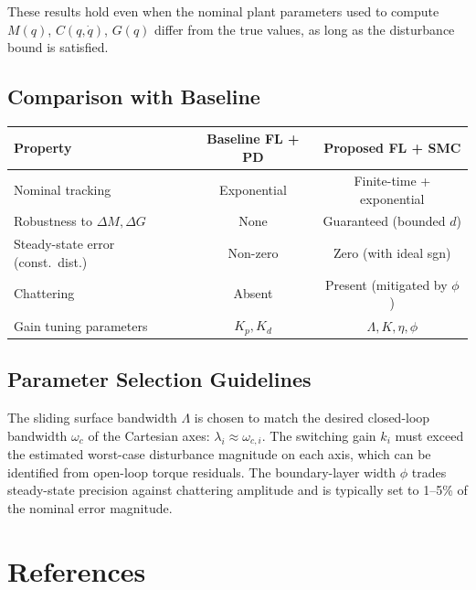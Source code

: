 \documentclass[11pt,a4paper]{article}
\begin{document}
These results hold even when the nominal plant parameters used to compute
$M(q)$, $C(q,\dot{q})$, $G(q)$ differ from the true values, as long as the
disturbance bound is satisfied.

\subsection{Comparison with Baseline}

\begin{center}
\begin{tabular}{@{}lcc@{}}
\toprule
\textbf{Property} & \textbf{Baseline FL + PD} & \textbf{Proposed FL + SMC} \\
\midrule
Nominal tracking               & Exponential          & Finite-time + exponential \\
Robustness to $\Delta M, \Delta G$ & None             & Guaranteed (bounded $d$)  \\
Steady-state error (const.\ dist.) & Non-zero         & Zero (with ideal sgn)     \\
Chattering                     & Absent               & Present (mitigated by $\phi$) \\
Gain tuning parameters         & $K_p, K_d$           & $\Lambda, K, \eta, \phi$  \\
\bottomrule
\end{tabular}
\end{center}

\subsection{Parameter Selection Guidelines}

The sliding surface bandwidth $\Lambda$ is chosen to match the desired
closed-loop bandwidth $\omega_c$ of the Cartesian axes: $\lambda_i \approx
\omega_{c,i}$. The switching gain $k_i$ must exceed the estimated worst-case
disturbance magnitude on each axis, which can be identified from open-loop
torque residuals. The boundary-layer width $\phi$ trades steady-state precision
against chattering amplitude and is typically set to 1--5\% of the nominal error
magnitude.

\section*{References}
\end{document}
